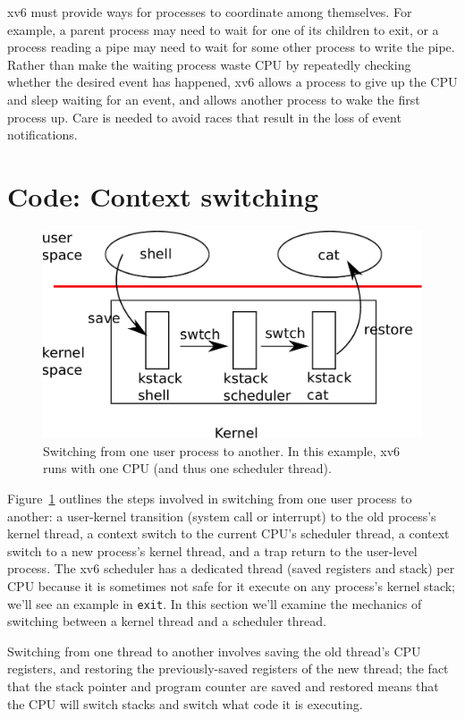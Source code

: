 xv6 must provide
ways for processes to coordinate among themselves. For example,
a parent process may need to wait for one of its children to
exit, or a process reading a pipe may need to wait for
some other process to write the pipe.
Rather than make the waiting process waste CPU by repeatedly checking
whether the desired event has happened, xv6 allows a process to give
up the CPU and sleep
waiting for an event, and allows another process to wake the first
process up. Care is needed to avoid races that result in
the loss of event notifications.
\section{Code: Context switching}

\begin{figure}[t]
\center
\includegraphics[scale=0.5]{fig/switch.pdf}
\caption{Switching from one user process to another.  In this example, xv6 runs with one CPU (and thus one scheduler thread).}
\label{fig:switch}
\end{figure}

Figure~\ref{fig:switch} 
outlines the steps involved in switching from one
user process to another:
a user-kernel transition (system
call or interrupt) to the old process's kernel thread,
a context switch to the current CPU's scheduler thread, a context
switch to a new process's kernel thread, and a trap return
to the user-level process.
The xv6 scheduler has a dedicated thread (saved registers and stack)
per CPU because
it is sometimes not safe for it execute on
any process's kernel stack;
we'll see an example in
\lstinline{exit}.
In this section we'll examine the mechanics of switching
between a kernel thread and a scheduler thread.

Switching from one thread to another involves saving the old thread's
CPU registers, and restoring the previously-saved registers of the
new thread; the fact that
the stack pointer and program counter
are saved and restored means that the CPU will switch stacks and
switch what code it is executing.

